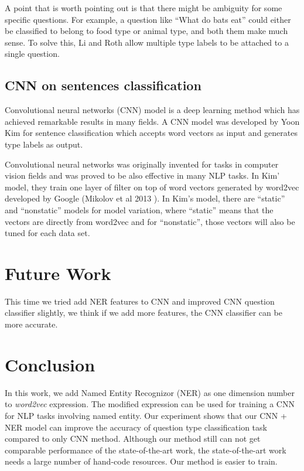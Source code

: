 \documentclass[10pt,twocolumn,letterpaper]{article}
\begin{document}
A point that is worth pointing out is that there might be ambiguity for some specific questions. For example, a question like ``What do bats eat'' could either be classified to belong to food type or animal type, and both them make much sense. To solve this, Li and Roth allow multiple type labels to be attached to a single question.

\subsection{CNN on sentences classification}
Convolutional neural networks (CNN) model is a deep learning method which has achieved remarkable results in many fields. A CNN model was developed by Yoon Kim \cite{kim2014convolutional} for sentence classification which accepts word vectors as input and generates type labels as output.

Convolutional neural networks was originally invented for tasks in computer vision fields and was proved to be also effective in many NLP tasks. In Kim' model, they train one layer of filter on top of word vectors generated by word2vec developed by Google (Mikolov et al 2013 \cite{mikolov2013efficient}). In Kim's model, there are ``static'' and ``nonstatic'' models for model variation, where ``static'' means that the vectors are directly from word2vec and for ``nonstatic'', those vectors will also be tuned for each data set.


\section{Future Work}
This time we tried add NER features to CNN and improved CNN question classifier slightly, we think if we add more features, the CNN classifier can be more accurate.

\section{Conclusion}
In this work, we add Named Entity Recognizor (NER) as one dimension number to \textit{word2vec} expression. The modified expression can be used for training a CNN for NLP tasks involving named entity. Our experiment shows that our CNN + NER model can improve the accuracy of question type classification task compared to only CNN method. Although our method still can not get comparable performance of the state-of-the-art work, the state-of-the-art work needs a large number of hand-code resources. Our method is easier to train.



{\small
\nocite{*}


}
\end{document}
